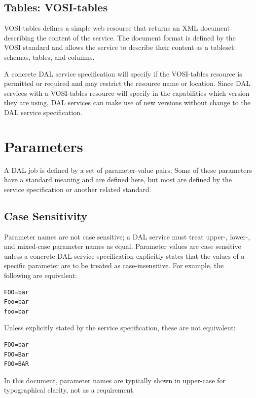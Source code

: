 \documentclass[11pt,letter]{ivoa}
\begin{document}
\subsection{Tables: VOSI-tables}
\label{sec:vosi-tables}
VOSI-tables \citep{std:VOSI} defines a simple web resource that returns an 
XML document 
describing the content of the service. The document format is defined by the 
VOSI \citep{std:VOSI} standard and allows the service to 
describe their content 
as a tableset: schemas, tables, and columns.

A concrete DAL service specification will specify if the VOSI-tables resource is 
permitted or required and may restrict the resource name or location.
Since DAL services with a VOSI-tables resource will specify 
in the capabilities which version they are using, DAL services can make use of 
new versions without change to the DAL service specification.

\section{Parameters}
\label{sec:parameters}
A DAL job is defined by a set of parameter-value pairs. Some of these parameters 
have a standard meaning and are defined here, but most are defined by the 
service specification or another related standard. 

\subsection{Case Sensitivity}
Parameter names are not case sensitive; a DAL service must treat
\hbox{upper-,} \hbox{lower-,} 
and mixed-case parameter names as equal. Parameter values are case sensitive 
unless a concrete DAL service specification explicitly states that the values of 
a specific parameter are to be treated as case-insensitive. For example, the 
following are equivalent:

\begin{verbatim}
FOO=bar
Foo=bar
foo=bar
\end{verbatim}

Unless explicitly stated by the service specification, these are not equivalent:

\begin{verbatim}
FOO=bar
FOO=Bar
FOO=BAR
\end{verbatim}

In this document, parameter names are typically shown in upper-case for 
typographical clarity, not as a requirement.
\end{document}

